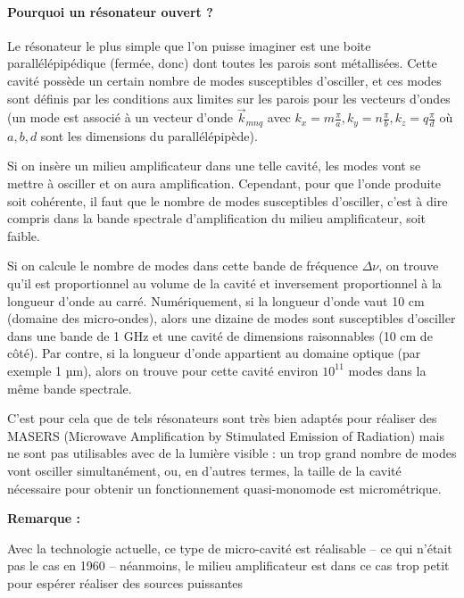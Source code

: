 \documentclass{book}
\begin{document}
\paragraph{Pourquoi un résonateur ouvert ?}
Le résonateur le plus simple que l'on puisse imaginer est une boite parallélépipédique (fermée, donc) dont toutes les parois sont métallisées. Cette cavité possède un certain nombre de modes susceptibles d'osciller, et ces modes sont définis par les conditions aux limites sur les parois pour les vecteurs d'ondes (un mode est associé à un vecteur d'onde $\vec k_{mnq}$ avec $k_x = m \frac \pi a, k_y = n \frac \pi b, k_z = q \frac \pi d$ où $a, b, d$ sont les dimensions du parallélépipède).

Si on insère un milieu amplificateur dans une telle cavité, les modes vont se mettre à osciller et on aura amplification. Cependant, pour que l'onde produite soit cohérente, il faut que le nombre de modes susceptibles d'osciller, c'est à dire compris dans la bande spectrale d'amplification du milieu amplificateur, soit faible.

Si on calcule le nombre de modes dans cette bande de fréquence $\Delta \nu$, on trouve qu'il est proportionnel au volume de la cavité et inversement proportionnel à la longueur d'onde au carré. Numériquement, si la longueur d'onde vaut 10 cm (domaine des micro-ondes), alors une dizaine de modes sont susceptibles d'osciller dans une bande de 1 GHz et une cavité de dimensions raisonnables (10 cm de côté). Par contre, si la longueur d'onde appartient au domaine optique (par exemple 1 µm), alors on trouve pour cette cavité environ $10^{11}$ modes dans la même bande spectrale.

C'est pour cela que de tels résonateurs sont très bien adaptés pour réaliser des MASERS (Microwave Amplification by Stimulated Emission of Radiation) mais ne sont pas utilisables avec de la lumière visible : un trop grand nombre de modes vont osciller simultanément, ou, en d'autres termes, la taille de la cavité nécessaire pour obtenir un fonctionnement quasi-monomode est micrométrique.

\textbf{\color{remarque1}Remarque :}  
\begin{mdframed}[linecolor=remarque1, backgroundcolor=remarque2]
Avec la technologie actuelle, ce type de micro-cavité est réalisable – ce qui n'était pas le cas en 1960 – néanmoins, le milieu amplificateur est dans ce cas trop petit pour espérer réaliser des sources puissantes
\end{mdframed}
\end{document}

